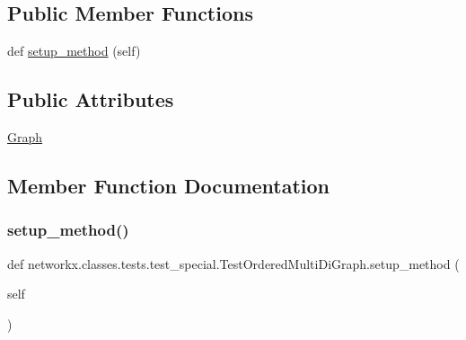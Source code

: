 \subsection*{Public Member Functions}
\begin{DoxyCompactItemize}
\item 
def \hyperlink{classnetworkx_1_1classes_1_1tests_1_1test__special_1_1TestOrderedMultiDiGraph_add3bf1679d3e53760d1ce2121f66c0e4}{setup\+\_\+method} (self)
\end{DoxyCompactItemize}
\subsection*{Public Attributes}
\begin{DoxyCompactItemize}
\item 
\hyperlink{classnetworkx_1_1classes_1_1tests_1_1test__special_1_1TestOrderedMultiDiGraph_af0e2bde48d429197e370c081b546c081}{Graph}
\end{DoxyCompactItemize}


\subsection{Member Function Documentation}
\mbox{\label{classnetworkx_1_1classes_1_1tests_1_1test__special_1_1TestOrderedMultiDiGraph_add3bf1679d3e53760d1ce2121f66c0e4}} 
\subsubsection{\texorpdfstring{setup\+\_\+method()}{setup\_method()}}
{\footnotesize\ttfamily def networkx.\+classes.\+tests.\+test\+\_\+special.\+Test\+Ordered\+Multi\+Di\+Graph.\+setup\+\_\+method (\begin{DoxyParamCaption}\item[{}]{self }\end{DoxyParamCaption})}



